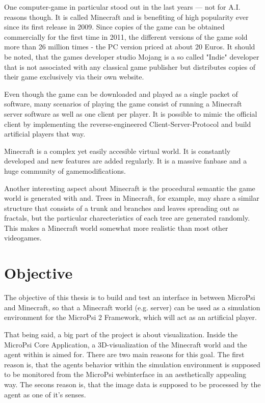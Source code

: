 One computer-game in particular stood out in the last years --- not for A.I. reasons though. It is called Minecraft and is benefiting of high popularity ever since its first release in 2009. Since copies of the game can be obtained commercially for the first time in 2011, the different versions of the game sold more than 26 million times - the PC version priced at about 20 Euros. It should be noted, that the games developer studio Mojang is a so called "Indie" developer that is not associated with any classical game publisher but distributes copies of their game exclusively via their own website.

Even though the game can be downloaded and played as a single packet of software, many scenarios of playing the game consist of running a Minecraft server software as well as one client per player. It is possible to mimic the official client by implementing the reverse-engineered Client-Server-Protocol and build artificial players that way.

Minecraft is a complex yet easily accesible virtual world. It is constantly developed and new features are added regularly. It is a massive fanbase and a huge community of gamemodifications.

Another interesting aspect about Minecraft is the procedural semantic the game world is generated with and. Trees in Minecraft, for example, may share a similar structure that consists of a trunk and branches and leaves spreading out as fractals, but the particular charecteristics of each tree are generated randomly. This makes a Minecraft world somewhat more realistic than most other videogames.

\section{Objective}
The objective of this thesis is to build and test an interface in between MicroPsi and Minecraft, so that a Minecraft world (e.g. server) can be used as a simulation environment for the MicroPsi 2 Framework, which will act as an artificial player.

That being said, a big part of the project is about visualization. Inside the MicroPsi Core Application, a 3D-visualization of the Minecraft world and the agent within is aimed for. There are two main reasons for this goal. The first reason is, that the agents behavior within the simulation environment is supposed to be monitored from the MicroPsi webinterface in an aesthetically appealing way. The secons reason is, that the image data is supposed to be processed by the agent as one of it's senses.


